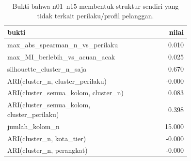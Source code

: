 \begin{table}[ht]
\centering\small
\begin{tabular}{p{0.75\linewidth}r}
\toprule
bukti & nilai \\
\midrule
max\_abs\_spearman\_n\_vs\_perilaku & 0.010 \\
max\_MI\_berlebih\_vs\_acuan\_acak & 0.025 \\
silhouette\_cluster\_n\_saja & 0.670 \\
ARI(cluster\_n, cluster\_perilaku) & -0.000 \\
ARI(cluster\_semua\_kolom, cluster\_n) & 0.083 \\
ARI(cluster\_semua\_kolom, cluster\_perilaku) & 0.398 \\
jumlah\_kolom\_n & 15.000 \\
ARI(cluster\_n, kota\_tier) & -0.000 \\
ARI(cluster\_n, perangkat) & -0.000 \\
\bottomrule
\end{tabular}
\caption{Bukti bahwa n01–n15 membentuk struktur sendiri yang tidak terkait perilaku/profil pelanggan.}
\label{tab:t3_bukti_n}
\end{table}
